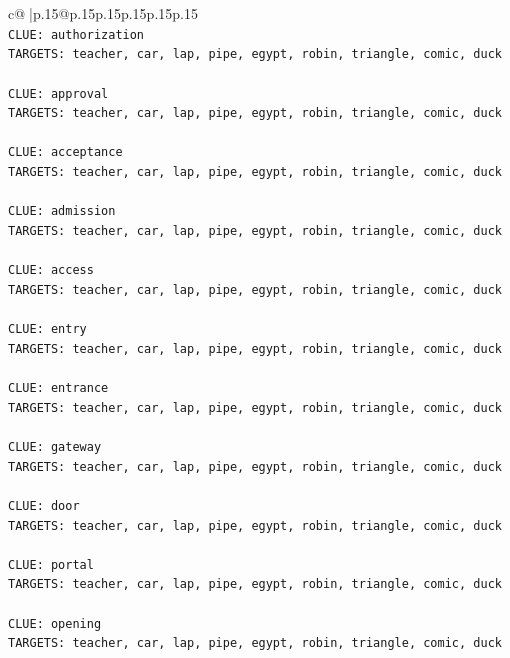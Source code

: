 \documentclass{article}
\begin{document}
{\begin{supertabular}{c@{$\;$}|p{.15\linewidth}@{}p{.15\linewidth}p{.15\linewidth}p{.15\linewidth}p{.15\linewidth}p{.15\linewidth}}
{{{\\ 
\texttt{CLUE: authorization} \\
\texttt{TARGETS: teacher, car, lap, pipe, egypt, robin, triangle, comic, duck} \\
\\ 
\texttt{CLUE: approval} \\
\texttt{TARGETS: teacher, car, lap, pipe, egypt, robin, triangle, comic, duck} \\
\\ 
\texttt{CLUE: acceptance} \\
\texttt{TARGETS: teacher, car, lap, pipe, egypt, robin, triangle, comic, duck} \\
\\ 
\texttt{CLUE: admission} \\
\texttt{TARGETS: teacher, car, lap, pipe, egypt, robin, triangle, comic, duck} \\
\\ 
\texttt{CLUE: access} \\
\texttt{TARGETS: teacher, car, lap, pipe, egypt, robin, triangle, comic, duck} \\
\\ 
\texttt{CLUE: entry} \\
\texttt{TARGETS: teacher, car, lap, pipe, egypt, robin, triangle, comic, duck} \\
\\ 
\texttt{CLUE: entrance} \\
\texttt{TARGETS: teacher, car, lap, pipe, egypt, robin, triangle, comic, duck} \\
\\ 
\texttt{CLUE: gateway} \\
\texttt{TARGETS: teacher, car, lap, pipe, egypt, robin, triangle, comic, duck} \\
\\ 
\texttt{CLUE: door} \\
\texttt{TARGETS: teacher, car, lap, pipe, egypt, robin, triangle, comic, duck} \\
\\ 
\texttt{CLUE: portal} \\
\texttt{TARGETS: teacher, car, lap, pipe, egypt, robin, triangle, comic, duck} \\
\\ 
\texttt{CLUE: opening} \\
\texttt{TARGETS: teacher, car, lap, pipe, egypt, robin, triangle, comic, duck} \\
\\ 
}}}
\end{supertabular}}
\end{document}
